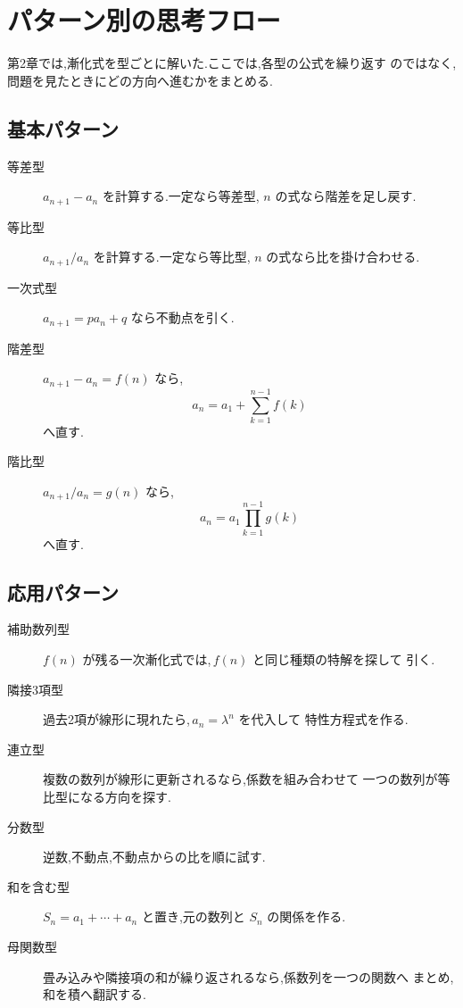
\section{パターン別の思考フロー}

第2章では,漸化式を型ごとに解いた.ここでは,各型の公式を繰り返す
のではなく,問題を見たときにどの方向へ進むかをまとめる.

\subsection{基本パターン}

\begin{description}
  \item[等差型]
    $a_{n+1}-a_n$ を計算する.一定なら等差型,
    $n$ の式なら階差を足し戻す.
  \item[等比型]
    $a_{n+1}/a_n$ を計算する.一定なら等比型,
    $n$ の式なら比を掛け合わせる.
  \item[一次式型]
    $a_{n+1}=pa_n+q$ なら不動点を引く.
  \item[階差型]
    $a_{n+1}-a_n=f(n)$ なら,
    \[
      a_n=a_1+\sum_{k=1}^{n-1}f(k)
    \]
    へ直す.
  \item[階比型]
    $a_{n+1}/a_n=g(n)$ なら,
    \[
      a_n=a_1\prod_{k=1}^{n-1}g(k)
    \]
    へ直す.
\end{description}

\subsection{応用パターン}

\begin{description}
  \item[補助数列型]
    $f(n)$ が残る一次漸化式では,\,$f(n)$ と同じ種類の特解を探して
    引く.
  \item[隣接3項型]
    過去2項が線形に現れたら,\,$a_n=\lambda^n$ を代入して
    特性方程式を作る.
  \item[連立型]
    複数の数列が線形に更新されるなら,係数を組み合わせて
    一つの数列が等比型になる方向を探す.
  \item[分数型]
    逆数,不動点,不動点からの比を順に試す.
  \item[和を含む型]
    $S_n=a_1+\cdots+a_n$ と置き,元の数列と $S_n$ の関係を作る.
  \item[母関数型]
    畳み込みや隣接項の和が繰り返されるなら,係数列を一つの関数へ
    まとめ,和を積へ翻訳する.
\end{description}

